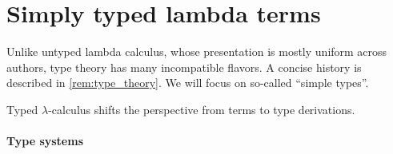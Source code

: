 \section{Simply typed lambda terms}\label{sec:simply_typed_lambda_terms}

Unlike untyped lambda calculus, whose presentation is mostly uniform across authors, type theory has many incompatible flavors. A concise history is described in \cref{rem:type_theory}. We will focus on so-called \enquote{simple types}.

Typed \( \lambda \)-calculus shifts the perspective from terms to type derivations.

\paragraph{Type systems}

